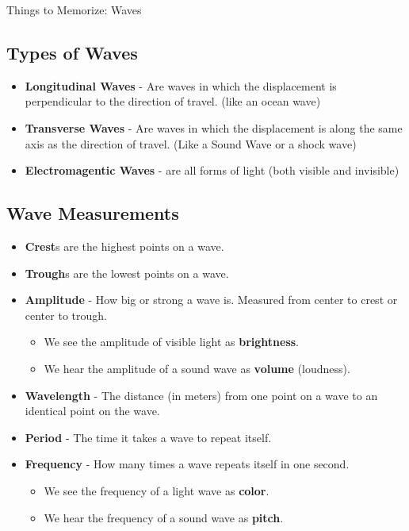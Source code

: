 \documentclass[letterpaper, 12pt]{article}
\begin{document}
	


\begin{center}Things to Memorize: Waves
\end{center}

\subsection*{Types of Waves}
	\begin{itemize}
		\item \textbf{Longitudinal Waves} - Are waves in which the displacement is perpendicular to the direction of travel.  (like an ocean wave)
		
		\item \textbf{Transverse Waves} - Are waves in which the displacement is along the same axis as the direction of travel.  (Like a Sound Wave or a shock wave)
		\item \textbf{Electromagentic Waves} - are all forms of light (both visible and invisible)
	\end{itemize}
\subsection*{Wave Measurements}
	\begin{itemize}
		\item \textbf{Crest}s are the highest points on a wave.
		\item \textbf{Trough}s are the lowest points on a wave. 
		\item \textbf{Amplitude} - How big or strong a wave is.  Measured from center to crest or center to trough.  
		\begin{itemize}
			\item We see the amplitude of visible light as \textbf{brightness}.
			\item We hear the amplitude of a sound wave as \textbf{volume} (loudness). 
		\end{itemize}
		\item \textbf{Wavelength} - The distance (in meters) from one point on a wave to an identical point on the wave.  
		\item \textbf{Period} - The time it takes a wave to repeat itself. 
		\item \textbf{Frequency} - How many times a wave repeats itself in one second. 
		\begin{itemize}
			\item We see the frequency of a light wave as \textbf{color}.
			\item We hear the frequency of a sound wave as \textbf{pitch}. 
		\end{itemize}
	\end{itemize}
\newpage 
\end{document}
